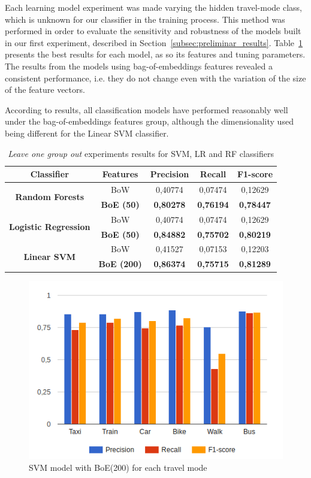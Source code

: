 Each learning model experiment was made varying the hidden travel-mode class, which is unknown for our classifier in the training process. This method was performed in order to evaluate the sensitivity and robustness of the models built in our first experiment, described in Section~\ref{subsec:preliminar_results}. Table~\ref{tab:results} presents the best results for each model, as so its features and tuning parameters. The results from the models using bag-of-embeddings features revealed a consistent performance, i.e. they do not change even with the variation of the size of the feature vectors.

According to results, all classification models have performed reasonably well under the bag-of-embeddings features group, although the dimensionality used being different for the Linear SVM classifier.

\begin{table}[htbp]
	\small
	\centering
	\caption{\emph{Leave one group out} experiments results for SVM, LR and RF classifiers}
	\label{tab:results}
	\begin{tabular}{|c|c|c|c|c|}
		\hline
		\textbf{Classifier} & \textbf{Features}  & \textbf{Precision} & \textbf{Recall}  & \textbf{F1-score} \\ \hline
		\multirow{2}{*}{\textbf{Random Forests}} & BoW & 0,40774 & 0,07474 & 0,12629  \\
		& \textbf{BoE (50)}  & \textbf{0,80278} & \textbf{0,76194} & \textbf{0,78447}  \\ \hline
		\multirow{2}{*}{\textbf{Logistic Regression}} & BoW & 0,40774 & 0,07474 & 0,12629  \\
		& \textbf{BoE (50)}  & \textbf{0,84882} & \textbf{0,75702} & \textbf{0,80219}  \\ \hline
		\multirow{2}{*}{\textbf{Linear SVM}} & BoW & 0,41527 & 0,07153 & 0,12203  \\
		& \textbf{BoE (200)} & \textbf{0,86374} & \textbf{0,75715} & \textbf{0,81289}  \\ \hline
	\end{tabular}
\end{table}

\begin{figure}[!htbp]
	\centering
	\includegraphics[scale=0.7]{figures/svm_linear_leave_one_out_emb_200.png}
	\caption{SVM model with BoE(200) for each travel mode}
	\label{fig:svm_leave}
\end{figure}

